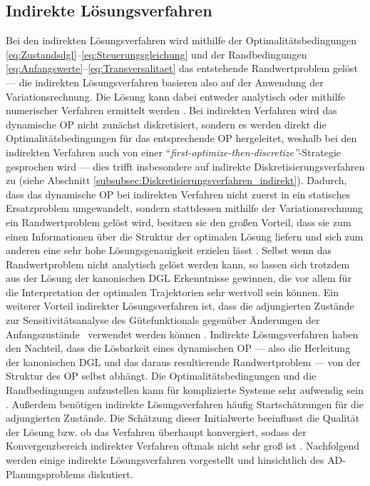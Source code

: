 \subsection{Indirekte Lösungsverfahren}\label{subsec:Indirekt}
Bei den indirekten Lösungsverfahren wird mithilfe der Optimalitätsbedingungen \eqref{eq:Zustandsdgl}--\eqref{eq:Steuerungsgleichung} und der Randbedingungen \eqref{eq:Anfangswerte}--\eqref{eq:Transversalitaet} das entstehende Randwertproblem gelöst \cite{Papageorgiou.2012} --- die indirekten Lösungsverfahren basieren also auf der Anwendung der Variationsrechnung. Die Lösung kann dabei entweder analytisch oder mithilfe numerischer Verfahren ermittelt werden \cite{Gerdts.2010}. Bei indirekten Verfahren wird das dynamische \gls{OP} nicht zunächst diskretisiert, sondern es werden direkt die Optimalitätsbedingungen für das entsprechende \gls{OP} hergeleitet, weshalb bei den indirekten Verfahren auch von einer ``\textit{first-optimize-then-discretize''}-Strategie gesprochen wird \cite{Papageorgiou.2012} --- dies trifft insbesondere auf indirekte Diskretisierungsverfahren zu (siehe Abschnitt \ref{subsubsec:Diskretisierungsverfahren_indirekt}). Dadurch, dass das dynamische \gls{OP} bei indirekten Verfahren nicht zuerst in ein statisches Ersatzproblem umgewandelt, sondern stattdessen mithilfe der Variationsrechnung ein Randwertproblem gelöst wird, besitzen sie den großen Vorteil, dass sie zum einen Informationen über die Struktur der optimalen Lösung liefern und sich zum anderen eine sehr hohe Lösungsgenauigkeit erzielen lässt \cite{KnutGraichen.2012}. Selbst wenn das Randwertproblem nicht analytisch gelöst werden kann, so lassen sich trotzdem aus der Lösung der kanonischen \gls{DGL} Erkenntnisse gewinnen, die vor allem für die Interpretation der optimalen Trajektorien sehr wertvoll sein können. Ein weiterer Vorteil indirekter Lösungsverfahren ist, dass die adjungierten Zustände zur Sensitivitätsanalyse des Gütefunktionals gegenüber Änderungen der Anfangszustände \xzero~verwendet werden können \cite{KnutGraichen.2012}. Indirekte Lösungsverfahren haben den Nachteil, dass die Lösbarkeit eines dynamischen \gls{OP} --- also die Herleitung der kanonischen \gls{DGL} und das daraus resultierende Randwertproblem --- von der Struktur des \gls{OP} selbst abhängt. Die Optimalitätsbedingungen und die Randbedingungen aufzustellen kann für komplizierte Systeme sehr aufwendig sein \cite{Papageorgiou.2012}. Außerdem benötigen indirekte Lösungsverfahren häufig Startschätzungen für die adjungierten Zustände. Die Schätzung dieser Initialwerte beeinflusst die Qualität der Lösung bzw. ob das Verfahren überhaupt konvergiert, sodass der Konvergenzbereich indirekter Verfahren oftmals nicht sehr groß ist \cite{Papageorgiou.2012}. Nachfolgend werden einige indirekte Lösungsverfahren vorgestellt und hinsichtlich des \gls{AD}-Planungsproblems diskutiert. 
